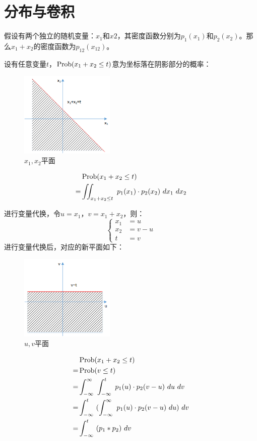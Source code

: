 \section{分布与卷积}
假设有两个独立的随机变量：$x_1$和$x2$，其密度函数分别为$p_1(x_1)$和$p_2(x_2)$。那么$x_1+x_2$的密度函数为$p_{12}(x_{12})$。

设有任意变量$t$，$\operatorname{Prob}(x_1+x_2\leq t)$意为坐标落在阴影部分的概率：
\begin{figure}[H]
	\centering
	\includegraphics[width=0.4\textwidth]{assets/prob1.png}
	\caption{$x_1,x_2$平面}
\end{figure}
\begin{align*}
	  & \operatorname{Prob}(x_1+x_2\leq t)                                      \\
	= & \iint_{x_1+x_2\leq t}\ p_1(x_1)\cdot p_2(x_2)\ dx_1\ dx_2
\end{align*}

进行变量代换，令$u=x_1$，$v=x_1+x_2$，则：
$$
	\begin{cases}
		x_1 & =u   \\
		x_2 & =v-u \\
		t   & =v
	\end{cases}
$$
进行变量代换后，对应的新平面如下：
\begin{figure}[H]
	\centering
	\includegraphics[width=0.4\textwidth]{assets/prob2.png}
	\caption{$u,v$平面}
\end{figure}
\begin{align*}
	  & \operatorname{Prob}(x_1+x_2\leq t)                                                        \\
	= & \operatorname{Prob}(v\leq t)                                                              \\
	= & \int_{-\infty}^{\infty}\ \int_{-\infty}^{t}\ p_1(u)\cdot p_2(v-u)\ du\ dv   \\
	= & \int_{-\infty}^{t}\ (\int_{-\infty}^{\infty}\ p_1(u)\cdot p_2(v-u)\ du)\ dv \\
	= & \int_{-\infty}^{t}\ (p_1*p_2)\ dv
\end{align*}

